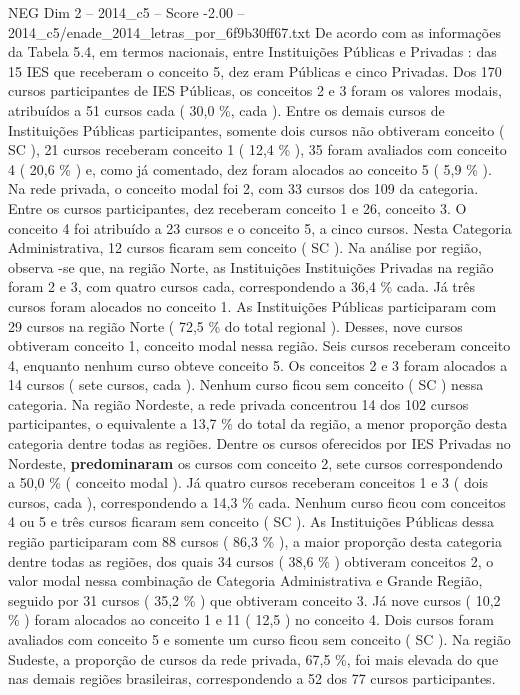 \begin{textsample}{NEG Dim 2 – 2014\_c5 – Score -2.00 – 2014\_c5/enade\_2014\_letras\_por\_6f9b30ff67.txt}
De acordo com as informações da Tabela 5.4, em termos nacionais, entre Instituições Públicas e Privadas : das 15 IES que receberam o conceito 5, dez eram Públicas e cinco Privadas.
Dos 170 cursos participantes de IES Públicas, os conceitos 2 e 3 foram os valores modais, atribuídos a 51 cursos cada ( 30,0 \%, cada ).
Entre os demais cursos de Instituições Públicas participantes, somente dois cursos não obtiveram conceito ( SC ), 21 cursos receberam conceito 1 ( 12,4 \% ), 35 foram avaliados com conceito 4 ( 20,6 \% ) e, como já comentado, dez foram alocados ao conceito 5 ( 5,9 \% ).
Na rede privada, o conceito modal foi 2, com 33 cursos dos 109 da categoria.
Entre os cursos participantes, dez receberam conceito 1 e 26, conceito 3.
O conceito 4 foi atribuído a 23 cursos e o conceito 5, a cinco cursos.
Nesta Categoria Administrativa, 12 cursos ficaram sem conceito ( SC ).
Na análise por região, observa -se que, na região Norte, as Instituições Instituições Privadas na região foram 2 e 3, com quatro cursos cada, correspondendo a 36,4 \% cada.
Já três cursos foram alocados no conceito 1.
As Instituições Públicas participaram com 29 cursos na região Norte ( 72,5 \% do total regional ).
Desses, nove cursos obtiveram conceito 1, conceito modal nessa região.
Seis cursos receberam conceito 4, enquanto nenhum curso obteve conceito 5.
Os conceitos 2 e 3 foram alocados a 14 cursos ( sete cursos, cada ).
Nenhum curso ficou sem conceito ( SC ) nessa categoria.
Na região Nordeste, a rede privada concentrou 14 dos 102 cursos participantes, o equivalente a 13,7 \% do total da região, a menor proporção desta categoria dentre todas as regiões.
Dentre os cursos oferecidos por IES Privadas no Nordeste, \textbf{predominaram} os cursos com conceito 2, sete cursos correspondendo a 50,0 \% ( conceito modal ).
Já quatro cursos receberam conceitos 1 e 3 ( dois cursos, cada ), correspondendo a 14,3 \% cada.
Nenhum curso ficou com conceitos 4 ou 5 e três cursos ficaram sem conceito ( SC ).
As Instituições Públicas dessa região participaram com 88 cursos ( 86,3 \% ), a maior proporção desta categoria dentre todas as regiões, dos quais 34 cursos ( 38,6 \% ) obtiveram conceitos 2, o valor modal nessa combinação de Categoria Administrativa e Grande Região, seguido por 31 cursos ( 35,2 \% ) que obtiveram conceito 3.
Já nove cursos ( 10,2 \% ) foram alocados ao conceito 1 e 11 ( 12,5 ) no conceito 4.
Dois cursos foram avaliados com conceito 5 e somente um curso ficou sem conceito ( SC ).
Na região Sudeste, a proporção de cursos da rede privada, 67,5 \%, foi mais elevada do que nas demais regiões brasileiras, correspondendo a 52 dos 77 cursos participantes.

\end{textsample}
